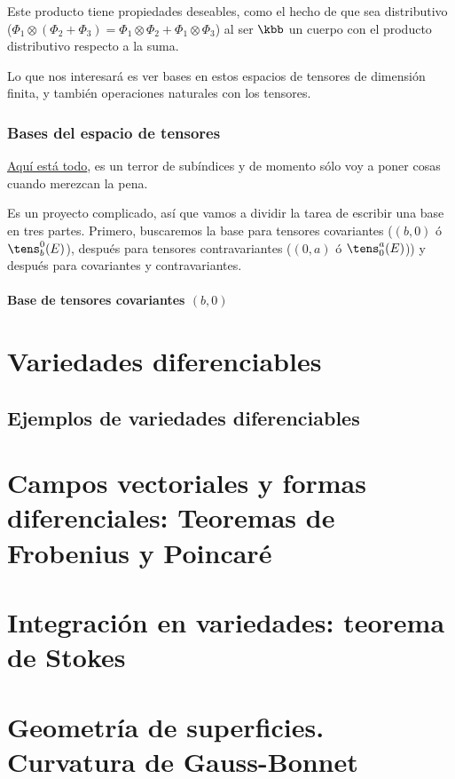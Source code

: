 \documentclass{apuntes}
\begin{document}
Este producto tiene propiedades deseables, como el hecho de que sea distributivo ($Φ_1 \otimes (Φ_2 + Φ_3) = Φ_1 \otimes Φ_2 + Φ_1 \otimes Φ_3$) al ser $\kbb$ un cuerpo con el producto distributivo respecto a la suma.

Lo que nos interesará es ver bases en estos espacios de tensores de dimensión finita, y también operaciones naturales con los tensores.

\subsection{Bases del espacio de tensores}

\href{https://moodle.uam.es/pluginfile.php/424487/mod_resource/content/1/fasc-3-multilineal.pdf}{Aquí está todo}, es un terror de subíndices y de momento sólo voy a poner cosas cuando merezcan la pena.

Es un proyecto complicado, así que vamos a dividir la tarea de escribir una base en tres partes. Primero, buscaremos la base para tensores covariantes ($(b,0)$ ó $\tens_b^0 (E)$), después para tensores contravariantes ($(0,a)$ ó $\tens_0^a (E)$)) y después para covariantes y contravariantes.

\subsubsection{Base de tensores covariantes $(b,0)$}

\chapter{Variedades diferenciables}

\section{Ejemplos de variedades diferenciables}

\chapter{Campos vectoriales y formas diferenciales: Teoremas de Frobenius y Poincaré}

\chapter{Integración en variedades: teorema de Stokes}

\chapter{Geometría de superficies. Curvatura de Gauss-Bonnet}
\end{document}
